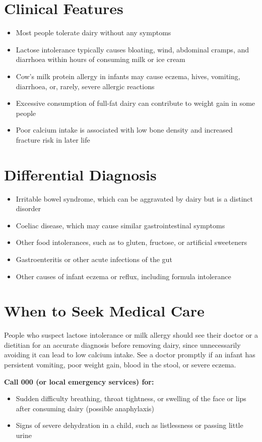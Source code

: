 \section*{Clinical Features}
\begin{itemize}
    \item Most people tolerate dairy without any symptoms
    \item Lactose intolerance typically causes bloating, wind, abdominal cramps, and diarrhoea within hours of consuming milk or ice cream
    \item Cow's milk protein allergy in infants may cause eczema, hives, vomiting, diarrhoea, or, rarely, severe allergic reactions
    \item Excessive consumption of full-fat dairy can contribute to weight gain in some people
    \item Poor calcium intake is associated with low bone density and increased fracture risk in later life
\end{itemize}

\section*{Differential Diagnosis}
\begin{itemize}
    \item Irritable bowel syndrome, which can be aggravated by dairy but is a distinct disorder
    \item Coeliac disease, which may cause similar gastrointestinal symptoms
    \item Other food intolerances, such as to gluten, fructose, or artificial sweeteners
    \item Gastroenteritis or other acute infections of the gut
    \item Other causes of infant eczema or reflux, including formula intolerance
\end{itemize}

\section*{When to Seek Medical Care}
People who suspect lactose intolerance or milk allergy should see their doctor or a dietitian for an accurate diagnosis before removing dairy, since unnecessarily avoiding it can lead to low calcium intake. See a doctor promptly if an infant has persistent vomiting, poor weight gain, blood in the stool, or severe eczema.

\textbf{Call 000 (or local emergency services) for:}
\begin{itemize}
    \item Sudden difficulty breathing, throat tightness, or swelling of the face or lips after consuming dairy (possible anaphylaxis)
    \item Signs of severe dehydration in a child, such as listlessness or passing little urine
\end{itemize}

